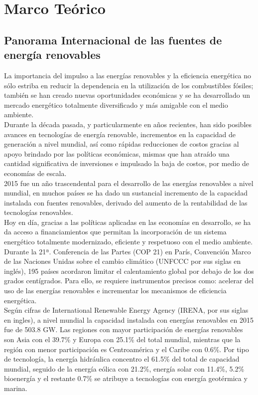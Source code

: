 \chapter{Marco Teórico}

\section{Panorama Internacional de las fuentes de energía renovables}
La importancia del impulso a las energías renovables y la eficiencia energética no sólo estriba en reducir la dependencia en la utilización de los combustibles fósiles; también se han creado nuevas oportunidades económicas y se ha desarrollado un mercado energético totalmente diversificado y más amigable con el medio ambiente.\\

Durante la década pasada, y particularmente en años recientes, han sido posibles avances en tecnologías de energía renovable, incrementos en la capacidad de generación a nivel mundial, así como rápidas reducciones de costos gracias al apoyo brindado por las políticas económicas, mismas que han atraído una cantidad significativa de inversiones e impulsado la baja de costos, por medio de economías de escala.\\

2015 fue un año trascendental para el desarrollo de las energías renovables a nivel mundial, en muchos países se ha dado un sustancial incremento de la capacidad instalada con fuentes renovables, derivado del aumento de la rentabilidad de las tecnologías renovables.\\

Hoy en día, gracias a las políticas aplicadas en las economías en desarrollo, se ha da acceso a financiamientos que permitan la incorporación de un sistema energético totalmente modernizado, eficiente y respetuoso con el medio ambiente. Durante la 21ª. Conferencia de las Partes (COP 21) en París, Convención Marco de las Naciones Unidas sobre el cambio climático (UNFCCC por sus siglas en inglés), 195 países acordaron limitar el calentamiento global por debajo de los dos grados centígrados. Para ello, se requiere instrumentos precisos como: acelerar del uso de las energías renovables e incrementar los mecanismos de eficiencia energética.\\

Según cifras de International Renewable Energy Agency (IRENA, por sus siglas en ingles), a nivel mundial la capacidad instalada con energías renovables en 2015 fue de 503.8 GW. Las regiones con mayor participación de energías renovables son Asia con el 39.7\% y Europa con 25.1\% del total mundial, mientras que la región con menor participación es Centroamérica y el Caribe con 0.6\%. Por tipo de tecnología, la energía hidráulica concentro el 61.5\% del total de capacidad mundial, seguido de la energía eólica con 21.2\%, energía solar con 11.4\%, 5.2\% bioenergía y el restante 0.7\% se atribuye a tecnologías con energía geotérmica y marina.\\


